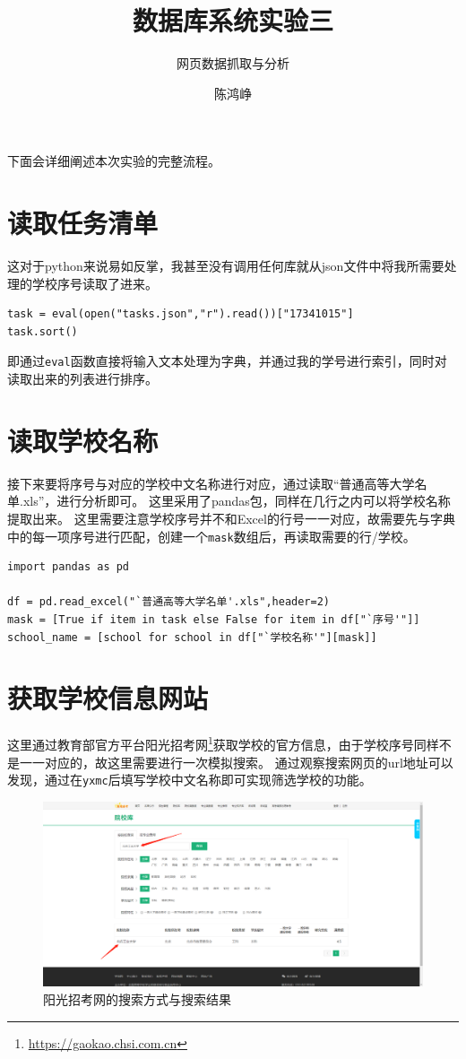 \documentclass[logo,reportComp]{thesis}
\title{数据库系统实验三}
\subtitle{网页数据抓取与分析}
\author{陈鸿峥}
\begin{document}
\maketitle

下面会详细阐述本次实验的完整流程。

\section{读取任务清单}
这对于python来说易如反掌，我甚至没有调用任何库就从json文件中将我所需要处理的学校序号读取了进来。
\begin{lstlisting}
task = eval(open("tasks.json","r").read())["17341015"]
task.sort()
\end{lstlisting}
即通过\verb'eval'函数直接将输入文本处理为字典，并通过我的学号进行索引，同时对读取出来的列表进行排序。

\section{读取学校名称}
接下来要将序号与对应的学校中文名称进行对应，通过读取“普通高等大学名单.xls”，进行分析即可。
这里采用了pandas包，同样在几行之内可以将学校名称提取出来。
这里需要注意学校序号并不和Excel的行号一一对应，故需要先与字典中的每一项序号进行匹配，创建一个\verb'mask'数组后，再读取需要的行/学校。
\begin{lstlisting}
import pandas as pd

df = pd.read_excel("`普通高等大学名单'.xls",header=2)
mask = [True if item in task else False for item in df["`序号'"]]
school_name = [school for school in df["`学校名称'"][mask]]
\end{lstlisting}

\section{获取学校信息网站}
这里通过教育部官方平台阳光招考网\footnote{\url{https://gaokao.chsi.com.cn}}获取学校的官方信息，由于学校序号同样不是一一对应的，故这里需要进行一次模拟搜索。
通过观察搜索网页的url地址可以发现，通过在\verb'yxmc'后填写学校中文名称即可实现筛选学校的功能。
\begin{figure}[H]
\centering
\includegraphics[width=\linewidth]{fig/search_school.png}
\caption{阳光招考网的搜索方式与搜索结果}
\end{figure}
\end{document}
